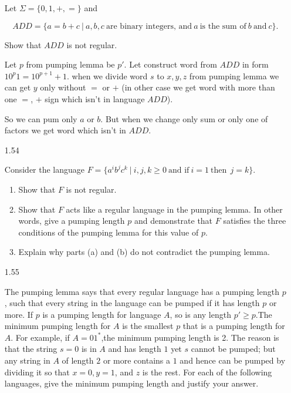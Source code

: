 \begin{enumerate}
            Let $\Sigma = \{0,1,+,=\}$ and 
            
            $$ADD = \{a=b+c~|~a,b,c~\text{are binary integers, and}~ a~ \text{is the sum of}~ b ~\text{and}~ c\}.$$
            
            Show that $ADD$ is not regular.
            
            Let $p$ from pumping lemma be $p'$. Let construct word from $ADD$ in form $10^p1 = 10^{p+1} + 1$.
            when we divide word $s$ to $x,y,z$ from pumping lemma we can get $y$ only without $=$ or $+$ (in other case we get word with more than one $=$, $+$ sign which isn't in language $ADD$).
            
            So we can pum only $a$ or $b$. But when we change only sum or only one of factors we get word which isn't in $ADD$.
            
      \item [1.54]
            
            Consider the language $F = \{a^i b^j c^k ~|~ i,j,k \geq 0~ \text{and if}~ i=1~ \text{then}~~ j = k\}$. 
            \begin{enumerate}
                  \item Show that $F$ is not regular.
                  \item Show that $F$ acts like a regular language in the pumping lemma. In other words, give a pumping length $p$ and demonstrate that $F$ satisfies the three conditions of the pumping lemma for this value of $p$.
                  \item Explain why parts (a) and (b) do not contradict the pumping lemma.
                        
            \end{enumerate}
            
      \item [1.55]
            
            The pumping lemma says that every regular language has a pumping length $p$, such that every string in the language can be pumped if it has length $p$ or more. If $p$ is a pumping length for language $A$, so is any length $p' \ge p$.The minimum pumping length for $A$ is the smallest $p$ that is a pumping length for $A$. For example, if $A=01^\ast$,the minimum pumping length is 2. The reason is that the string $s = 0$ is in $A$ and has length $1$ yet $s$ cannot be pumped; but any string in $A$ of length $2$ or more contains a $1$ and hence can be pumped by dividing it so that $x = 0, y = 1$, and $z$ is the rest. For each of the following languages, give the minimum pumping length and justify your answer.
            

\end{enumerate}
